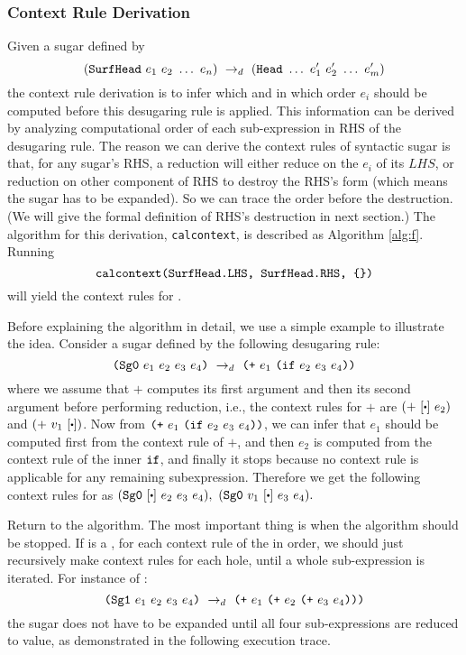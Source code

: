 \subsubsection{Context Rule Derivation}
Given a sugar  defined by
\[
(\mbox{\tt SurfHead}~e_1~e_2~\ldots~e_n) ~\rightarrow_d~ (\mbox{\tt Head}~\ldots~e_1'~e_2'~\ldots~e_m')
\]
the context rule derivation is to infer which and in which order $e_i$ should be computed before this desugaring rule is applied. This information can be derived by analyzing computational order of each sub-expression in RHS of the desugaring rule. The reason we can derive the context rules of syntactic sugar is that, for any sugar's RHS, a reduction will either reduce on the $e_i$ of its $LHS$, or reduction on other component of RHS to destroy the RHS's form (which means the sugar has to be expanded). So we can trace the order before the destruction. (We will give the formal definition of RHS's destruction in next section.) The algorithm for this derivation, \texttt{calcontext}, is described as Algorithm \ref{alg:f}. Running
\[
 \texttt{calcontext(\mbox{\tt SurfHead}.LHS,~\mbox{\tt SurfHead}.RHS, \{\})}
\]
will yield the context rules for .

Before explaining the algorithm in detail, we use a simple example to illustrate the idea.
Consider a sugar  defined by the following desugaring rule:
\[
\mbox{\tt (Sg0}~e_1~e_2~e_3~e_4\mbox{\tt )} ~\rightarrow_d~ \mbox{\tt (+}~e_1~\mbox{\tt (if}~e_2~e_3~e_4\mbox{\tt ))}
\]
where we assume that $+$ computes its first argument and then its second argument before performing reduction, i.e., the context rules for $+$ are  $(+~[\bigcdot]~e_2)$ and $(+~v_1~[\bigcdot])$. Now from $\mbox{\tt (+}~e_1~\mbox{\tt (if}~e_2~e_3~e_4\mbox{\tt ))}$, we can infer that $e_1$ should be computed first from the context rule of $+$, and then $e_2$ is computed from the context rule of the inner $\mbox{\tt if}$, and finally it stops because no context rule is applicable for any remaining subexpression. Therefore we get the following context rules for  as
$
(\m{Sg0}~[\bigcdot]~e_2~e_3~e_4),~(\m{Sg0}~v_1~[\bigcdot]~e_3~e_4).
$

Return to the algorithm. The most important thing is when the algorithm should be stopped. If  is a , for each context rule of the  in order, we should just recursively make context rules for each hole, until a whole sub-expression is iterated. For instance of :
\[
\mbox{\tt (Sg1}~e_1~e_2~e_3~e_4\mbox{\tt )} ~\rightarrow_d~ \mbox{\tt (+}~e_1~\mbox{\tt (+}~e_2~\mbox{\tt (+}~e_3~e_4\mbox{\tt )))}
\]
the sugar does not have to be expanded until all four sub-expressions are reduced to value, as demonstrated in the following execution trace.

